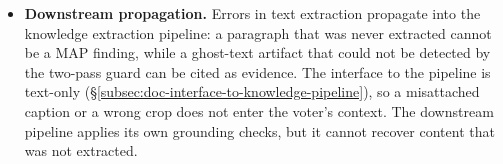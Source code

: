 \begin{itemize}[label={}, leftmargin=1.5em, itemsep=0.4em]
    \item \textbf{Downstream propagation.} Errors in text extraction propagate into the knowledge extraction pipeline: a paragraph that was never extracted cannot be a MAP finding, while a ghost-text artifact that could not be detected by the two-pass guard can be cited as evidence. The interface to the pipeline is text-only (§\ref{subsec:doc-interface-to-knowledge-pipeline}), so a misattached caption or a wrong crop does not enter the voter's context. The downstream pipeline applies its own grounding checks, but it cannot recover content that was not extracted. 
\end{itemize}
